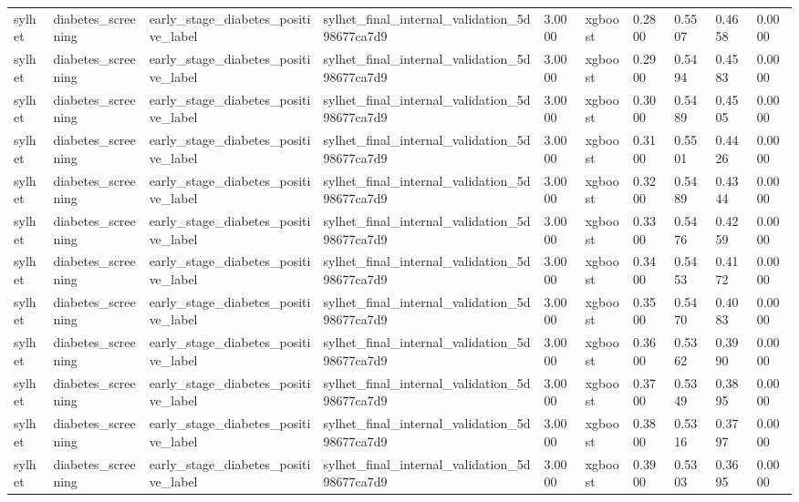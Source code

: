 \begin{tabular}{llllllllll}
sylhet & diabetes\_screening & early\_stage\_diabetes\_positive\_label & sylhet\_final\_internal\_validation\_5d98677ca7d9 & 3.0000 & xgboost & 0.2800 & 0.5507 & 0.4658 & 0.0000 \\
sylhet & diabetes\_screening & early\_stage\_diabetes\_positive\_label & sylhet\_final\_internal\_validation\_5d98677ca7d9 & 3.0000 & xgboost & 0.2900 & 0.5494 & 0.4583 & 0.0000 \\
sylhet & diabetes\_screening & early\_stage\_diabetes\_positive\_label & sylhet\_final\_internal\_validation\_5d98677ca7d9 & 3.0000 & xgboost & 0.3000 & 0.5489 & 0.4505 & 0.0000 \\
sylhet & diabetes\_screening & early\_stage\_diabetes\_positive\_label & sylhet\_final\_internal\_validation\_5d98677ca7d9 & 3.0000 & xgboost & 0.3100 & 0.5501 & 0.4426 & 0.0000 \\
sylhet & diabetes\_screening & early\_stage\_diabetes\_positive\_label & sylhet\_final\_internal\_validation\_5d98677ca7d9 & 3.0000 & xgboost & 0.3200 & 0.5489 & 0.4344 & 0.0000 \\
sylhet & diabetes\_screening & early\_stage\_diabetes\_positive\_label & sylhet\_final\_internal\_validation\_5d98677ca7d9 & 3.0000 & xgboost & 0.3300 & 0.5476 & 0.4259 & 0.0000 \\
sylhet & diabetes\_screening & early\_stage\_diabetes\_positive\_label & sylhet\_final\_internal\_validation\_5d98677ca7d9 & 3.0000 & xgboost & 0.3400 & 0.5453 & 0.4172 & 0.0000 \\
sylhet & diabetes\_screening & early\_stage\_diabetes\_positive\_label & sylhet\_final\_internal\_validation\_5d98677ca7d9 & 3.0000 & xgboost & 0.3500 & 0.5470 & 0.4083 & 0.0000 \\
sylhet & diabetes\_screening & early\_stage\_diabetes\_positive\_label & sylhet\_final\_internal\_validation\_5d98677ca7d9 & 3.0000 & xgboost & 0.3600 & 0.5362 & 0.3990 & 0.0000 \\
sylhet & diabetes\_screening & early\_stage\_diabetes\_positive\_label & sylhet\_final\_internal\_validation\_5d98677ca7d9 & 3.0000 & xgboost & 0.3700 & 0.5349 & 0.3895 & 0.0000 \\
sylhet & diabetes\_screening & early\_stage\_diabetes\_positive\_label & sylhet\_final\_internal\_validation\_5d98677ca7d9 & 3.0000 & xgboost & 0.3800 & 0.5316 & 0.3797 & 0.0000 \\
sylhet & diabetes\_screening & early\_stage\_diabetes\_positive\_label & sylhet\_final\_internal\_validation\_5d98677ca7d9 & 3.0000 & xgboost & 0.3900 & 0.5303 & 0.3695 & 0.0000 \\

\end{tabular}
